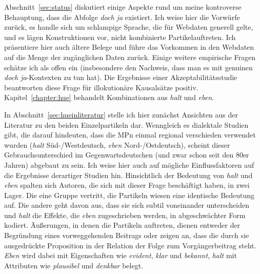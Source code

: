 Abschnitt~\ref{sec:status} diskutiert einige Aspekte rund um meine kontroverse Behauptung, dass die Abfolge \textit{doch ja} existiert. Ich weise hier die Vorwürfe zurück, es handle sich um schlampige Sprache, die für Webdaten generell gelte, und es lägen Konstruktionen vor, nicht kombinierte Partikelauftreten. Ich präsentiere hier auch ältere Belege und führe das Vorkommen in den Webdaten auf die Menge der zugänglichen Daten zurück. Einige weitere empirische Fragen schätze ich als offen ein (insbesondere den Nachweis, dass man es mit genuinen \textit{doch ja}-Kontexten zu tun hat). Die Ergebnisse einer Akzeptabilitätsstudie beantworten diese Frage für illokutionäre Kausalsätze positiv.\\

\noindent		
Kapitel~\ref{chapter:hue} behandelt Kombinationen aus \textit{halt} und \textit{eben}. 

In Abschnitt~\ref{sec:hueinliteratur} stelle ich hier zunächst Ansichten aus der Literatur zu den beiden Einzelpartikeln dar. Wenngleich es dialektale Studien gibt, die darauf hindeuten, dass die MPn einmal regional verschieden verwendet wurden (\textit{halt} Süd-/Westdeutsch, \textit{eben} Nord-/Ostdeutsch), scheint dieser Gebrauchsunterschied im Gegenwartsdeutschen (und zwar schon seit den 80er Jahren) abgebaut zu sein. Ich weise hier auch auf mögliche Einflussfaktoren auf die Ergebnisse derartiger Studien hin. Hinsichtlich der Bedeutung von \textit{halt} und \textit{eben} spalten sich Autoren, die sich mit dieser Frage beschäftigt haben, in zwei Lager. Die eine Gruppe vertritt, die Partikeln wiesen eine identische Bedeutung auf. Die andere geht davon aus, dass sie sich subtil voneinander unterscheiden und \textit{halt} die Effekte, die \textit{eben} zugeschrieben werden, in abgeschwächter Form kodiert. Äußerungen, in denen die Partikeln auftreten, dienen entweder der Begründung eines vorweggehenden Beitrags oder zeigen an, dass die durch sie ausgedrückte Proposition in der Relation der Folge zum Vorgängerbeitrag steht. \textit{Eben} wird dabei mit Eigenschaften wie \textit{evident}, \textit{klar} und \textit{bekannt}, \textit{halt} mit Attributen wie \textit{plausibel} und \textit{denkbar} belegt. 

